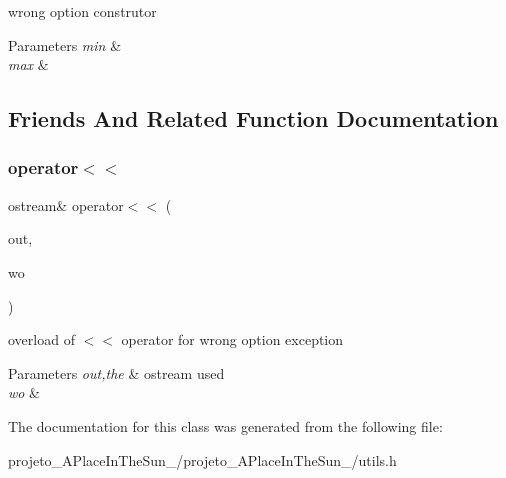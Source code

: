 wrong option construtor 


\begin{DoxyParams}{Parameters}
{\em min} & \\
\hline
{\em max} & \\
\hline
\end{DoxyParams}


\subsection{Friends And Related Function Documentation}
\hypertarget{class_wrong_option_a272717a9c47de3cdf605f30ccc0b7c08}{}\label{class_wrong_option_a272717a9c47de3cdf605f30ccc0b7c08} 
\subsubsection{\texorpdfstring{operator$<$$<$}{operator<<}}
{\footnotesize\ttfamily ostream\& operator$<$$<$ (\begin{DoxyParamCaption}\item[{ostream \&}]{out,  }\item[{\hyperlink{class_wrong_option}{Wrong\+Option} \&}]{wo }\end{DoxyParamCaption})\hspace{0.3cm}{\ttfamily [friend]}}



overload of $<$$<$ operator for wrong option exception 


\begin{DoxyParams}{Parameters}
{\em out,the} & ostream used\\
\hline
{\em wo} & \\
\hline
\end{DoxyParams}


The documentation for this class was generated from the following file\+:\begin{DoxyCompactItemize}
\item 
projeto\+\_\+\+A\+Place\+In\+The\+Sun\+\_/projeto\+\_\+\+A\+Place\+In\+The\+Sun\+\_/utils.\+h\end{DoxyCompactItemize}
